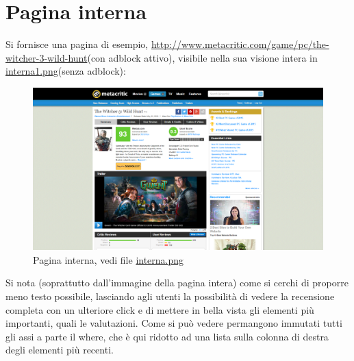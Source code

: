 \documentclass[12pt]{article}
\begin{document}
\section{Pagina interna}
Si fornisce una pagina di esempio, \url{http://www.metacritic.com/game/pc/the-witcher-3-wild-hunt}(con adblock attivo), visibile nella sua visione intera in \href{interna1.png}{interna1.png}(senza adblock):
\hypertarget{interna}{}
\begin{figure}[H]
	\begin{center}
		\includegraphics[width=13.5cm]{interna.png}
		\caption{Pagina interna, vedi file \href{interna.png}{interna.png}}
	\end{center}
\end{figure}
Si nota (soprattutto dall'immagine della pagina intera) come si cerchi di proporre meno testo possibile, lasciando agli utenti la possibilità di vedere la recensione completa con un ulteriore click e di mettere in bella vista gli elementi più importanti, quali le valutazioni.
Come si può vedere permangono immutati tutti gli assi a parte il where, che è qui ridotto ad una lista sulla colonna di destra degli elementi più recenti.
\newpage
\end{document}
